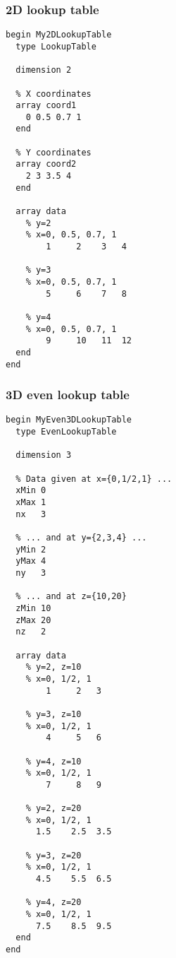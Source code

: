 
\subsubsection{2D lookup table}

\begin{verbatim}
begin My2DLookupTable
  type LookupTable

  dimension 2

  % X coordinates
  array coord1
    0 0.5 0.7 1
  end

  % Y coordinates
  array coord2
    2 3 3.5 4
  end

  array data
    % y=2
    % x=0, 0.5, 0.7, 1
        1	  2    3   4

    % y=3
    % x=0, 0.5, 0.7, 1
        5	  6    7   8

    % y=4
    % x=0, 0.5, 0.7, 1
        9	  10   11  12
  end
end
\end{verbatim}


\subsubsection{3D even lookup table}

\begin{verbatim}
begin MyEven3DLookupTable
  type EvenLookupTable

  dimension 3

  % Data given at x={0,1/2,1} ...
  xMin 0
  xMax 1
  nx   3

  % ... and at y={2,3,4} ...
  yMin 2
  yMax 4
  ny   3

  % ... and at z={10,20}
  zMin 10
  zMax 20
  nz   2

  array data
    % y=2, z=10
    % x=0, 1/2, 1
        1	  2   3

    % y=3, z=10
    % x=0, 1/2, 1
        4	  5   6

    % y=4, z=10
    % x=0, 1/2, 1
        7	  8   9

    % y=2, z=20
    % x=0, 1/2, 1
      1.5	 2.5  3.5

    % y=3, z=20
    % x=0, 1/2, 1
      4.5	 5.5  6.5

    % y=4, z=20
    % x=0, 1/2, 1
      7.5	 8.5  9.5
  end
end
\end{verbatim}



